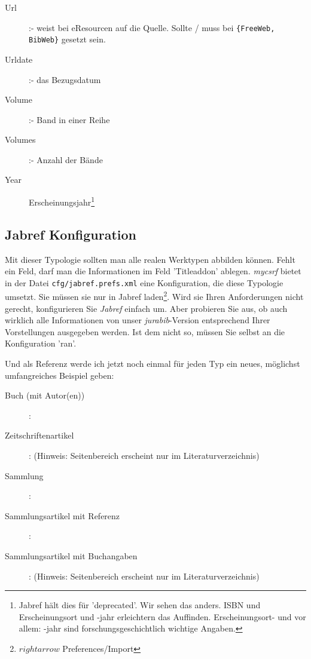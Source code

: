 \begin{description}
  \item[Url] :- weist bei eResourcen  auf
  die Quelle. Sollte / muss bei \texttt{\{FreeWeb, BibWeb\}} gesetzt sein.
  \item[Urldate] :- das Bezugsdatum
  \item[Volume] :- Band in einer Reihe
  \item[Volumes] :- Anzahl der Bände
  \item[Year] Erscheinungsjahr\footnote{Jabref hält dies für 'deprecated'. Wir sehen das
  anders. ISBN und Erscheinungsort und -jahr erleichtern das Auffinden.
  Erscheinungsort- und vor allem: -jahr sind forschungsgeschichtlich wichtige Angaben.}
 \end{description}


\subsection{Jabref Konfiguration}

Mit dieser Typologie sollten man alle realen Werktypen abbilden können. Fehlt
ein Feld, darf man die Informationen im Feld 'Titleaddon' ablegen. \emph{mycsrf}
bietet in der Datei  \texttt{cfg/jabref.prefs.xml} eine Konfiguration, die diese
Typologie umsetzt. Sie müssen sie nur in Jabref laden\footnote{$rightarrow$
Preferences/Import}. Wird sie Ihren Anforderungen nicht gerecht, konfigurieren
Sie \emph{Jabref} einfach um. Aber probieren Sie aus, ob auch wirklich alle
Informationen von unser \emph{jurabib}-Version entsprechend Ihrer Vorstellungen
ausgegeben werden. Ist dem nicht so, müssen Sie selbst an die Konfiguration
'ran'.

Und als Referenz werde ich jetzt noch einmal für jeden Typ ein neues, möglichst
umfangreiches Beispiel geben:

\begin{description}
  \item[Buch (mit Autor(en))] : \cite[][]{GarSpr2018a}
  \item[Zeitschriftenartikel] : \cite[][59]{Lewin1992a} (Hinweis: Seitenbereich erscheint nur im Literaturverzeichnis)
  \item[Sammlung] : \cite[][]{Cysarz1978a}
  \item[Sammlungsartikel mit Referenz] :  \cite[][]{Dach1978a}
  \item[Sammlungsartikel mit Buchangaben] : \cite[][]{Arndt1811a} (Hinweis: Seitenbereich erscheint nur im Literaturverzeichnis)
\end{description}
%
